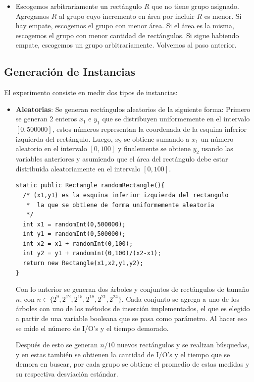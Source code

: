 \documentclass[letterpaper,12pt]{article}
\begin{document}
\begin{itemize}
\begin{itemize}
\item Escogemos arbitrariamente un rect\'angulo $R$ que no tiene grupo asignado. Agregamos $R$ al grupo cuyo incremento en \'area por incluir $R$ es menor. Si hay empate, escogemos el grupo con menor \'area. Si el \'area es la misma, escogemos el grupo con menor cantidad de rect\'angulos. Si sigue habiendo empate, escogemos un grupo arbitrariamente. Volvemos al paso anterior.
\end{itemize}
\end{itemize}
\subsection{Generaci\'on de Instancias}

El experimento consiste en medir dos tipos de instancias:
\begin{itemize}
\item \textbf{Aleatorias}: Se generan rect\'angulos aleatorios de la siguiente forma: Primero se generan 2 enteros $x_1$ e $y_1$ que se distribuyen uniformemente en el intervalo $[0,500000]$, estos n\'umeros representan la coordenada de la esquina inferior izquierda del rect\'angulo. Luego, $x_2$ se obtiene sumando a $x_1$ un n\'umero aleatorio en el intervalo $[0,100]$ y finalemente se obtiene $y_2$ usando las variables anteriores y asumiendo que el \'area del rect\'angulo debe estar distribuida aleatoriamente en el intervalo $[0,100]$.

\lstset{language=Java, breaklines=true, basicstyle=\footnotesize}
\begin{lstlisting}[frame=single]
static public Rectangle randomRectangle(){
  /* (x1,y1) es la esquina inferior izquierda del rectangulo
   *  la que se obtiene de forma uniformemente aleatoria
   */
  int x1 = randomInt(0,500000);
  int y1 = randomInt(0,500000);
  int x2 = x1 + randomInt(0,100);
  int y2 = y1 + randomInt(0,100)/(x2-x1);
  return new Rectangle(x1,x2,y1,y2);
}
\end{lstlisting}

Con lo anterior se generan dos \'arboles y conjuntos de rect\'angulos de tama\~no $n$, con $n \in \{2^9,2^{12},2^{15},2^{18},2^{21},2^{24}\}$. Cada conjunto se agrega a uno de los \'arboles con uno de los m\'etodos de inserci\'on implementados, el que es elegido a partir de una variable booleana que se pasa como par\'ametro. Al hacer eso se mide el n\'umero de I/O's y el tiempo demorado.

Despu\'es de esto se generan $n/10$ nuevos rect\'angulos y se realizan b\'usquedas, y en estas tambi\'en se obtienen la cantidad de I/O's y el tiempo que se demora en buscar, por cada grupo se obtiene el promedio de estas medidas y su respectiva desviaci\'on est\'andar.

\end{itemize}
\end{document}
